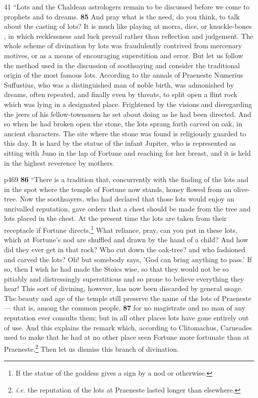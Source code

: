 41
``Lots and the Chaldean astrologers remain to be discussed before we come to prophets and to dreams. \textbf{85} And pray what is the need, do you think, to talk about the casting of lots? It is much like playing at morra, dice, or knuckle-bones , in which recklessness and luck prevail rather than reflection and judgement. The whole scheme of divination by lots was fraudulently contrived from mercenary motives, or as a means of encouraging superstition and error. But let us follow the method used in the discussion of soothsaying and consider the traditional origin of the most famous lots. According to the annals of Praeneste Numerius Suffustius, who was a distinguished man of noble birth, was admonished by dreams, often repeated, and finally even by threats, to split open a flint rock which was lying in a designated place. Frightened by the visions and disregarding the jeers of his fellow-townsmen he set about doing as he had been directed. And so when he had broken open the stone, the lots sprang forth carved on oak, in ancient characters. The site where the stone was found is religiously guarded to this day. It is hard by the statue of the infant Jupiter, who is represented as sitting with Juno in the lap of Fortune and reaching for her breast, and it is held in the highest reverence by mothers.

p469
\textbf{86} ``There is a tradition that, concurrently with the finding of the lots and in the spot where the temple of Fortune now stands, honey flowed from an olive-tree. Now the soothsayers, who had declared that those lots would enjoy an unrivalled reputation, gave orders that a chest should be made from the tree and lots placed in the chest. At the present time the lots are taken from their receptacle if Fortune directs.\texthebrew{}\footnote{If the statue of the goddess gives a sign by a nod or otherwise.

} What reliance, pray, can you put in these lots, which at Fortune's nod are shuffled and drawn by the hand of a child? And how did they ever get in that rock? Who cut down the oak-tree? and who fashioned and carved the lots? Oh! but somebody says, 'God can bring anything to pass.' If so, then I wish he had made the Stoics wise, so that they would not be so pitiably and distressingly superstitious and so prone to believe everything they hear! This sort of divining, however, has now been discarded by general usage. The beauty and age of the temple still preserve the name of the lots of Praeneste \texthebrew{—} that is, among the common people, \textbf{87} for no magistrate and no man of any reputation ever consults them; but in all other places lots have gone entirely out of use. And this explains the remark which, according to Clitomachus, Carneades used to make that he had at no other place seen Fortune more fortunate than at Praeneste.\texthebrew{}\footnote{\emph{i.e.} the reputation of the lots at Praeneste lasted longer than elsewhere.

} Then let us dismiss this branch of divination.

